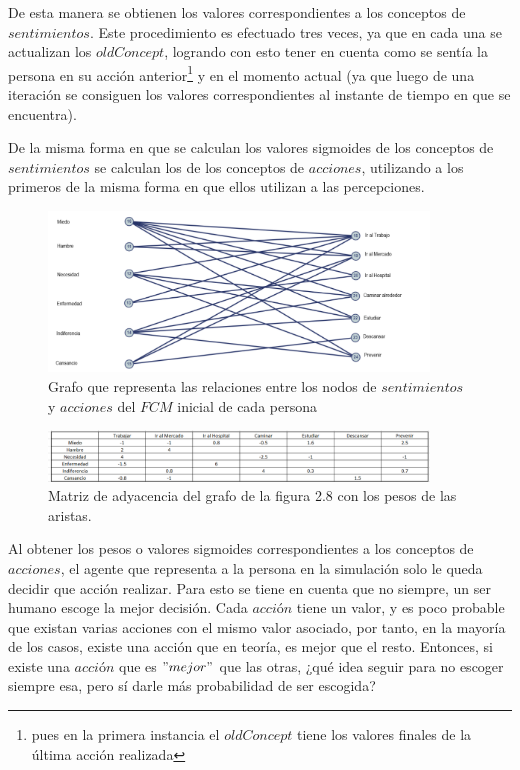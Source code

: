 De esta manera se obtienen los valores correspondientes a los conceptos de $sentimientos$. Este procedimiento
es efectuado tres veces, ya que en cada una se actualizan los $oldConcept$, logrando con esto tener en 
cuenta como se sentía la persona en su acción anterior\footnote{pues en la primera instancia el $oldConcept$
tiene los valores finales de la última acción realizada} y en el momento actual (ya que luego de una iteración
se consiguen los valores correspondientes al instante de tiempo en que se encuentra).

De la misma forma en que se calculan los valores sigmoides de los conceptos de $sentimientos$ se 
calculan los de los conceptos de $acciones$, utilizando a los primeros de la misma forma en que ellos
utilizan a las percepciones.
\begin{figure}[htb]
    \centering
    \includegraphics[width=0.9\textwidth]{Graphics/Grafo_Sent-Acciones.png}
    \caption{Grafo que representa las relaciones entre los nodos de $sentimientos$ y $acciones$ del $FCM$ inicial de cada persona}
\end{figure}

\begin{figure}[htb]
    \centering
    \includegraphics[width=0.9\textwidth]{Graphics/Pesos_aristas_Sent_Acc.png}
    \caption{Matriz de adyacencia del grafo de la figura 2.8 con los pesos de las aristas.}
\end{figure}

Al obtener los pesos o valores sigmoides correspondientes a los conceptos de $acciones$, el agente que 
representa a la persona en la simulación solo le queda decidir que acción realizar. Para esto se tiene en 
cuenta que no siempre, un ser humano escoge la mejor decisión. Cada $acci$ó$n$ tiene un valor, y es poco
probable que existan varias acciones con el mismo valor asociado, por tanto, en la mayoría de los casos,
existe una acción que en teoría, es mejor que el resto. Entonces, si existe una $acci$ó$n$ que es $"mejor"$
que las otras, ¿qué idea seguir para no escoger siempre esa, pero sí darle más probabilidad de ser escogida?

